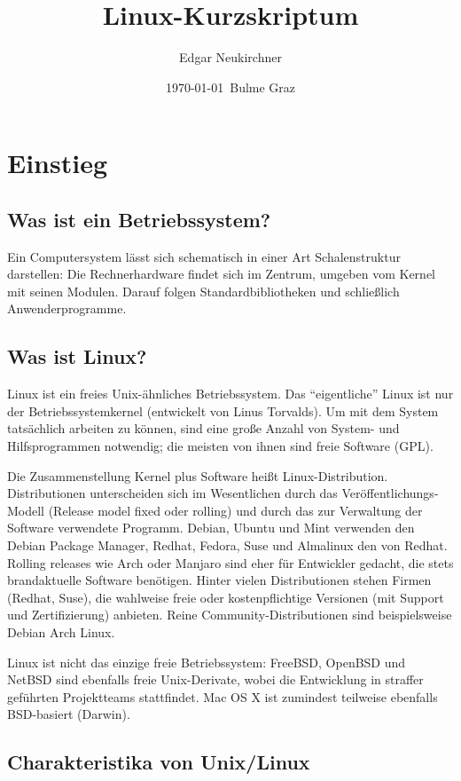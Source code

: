 \documentclass[11pt]{article}
\title{Linux-Kurzskriptum}
\author{Edgar Neukirchner}
\date{\mydate\today\ Bulme Graz}
\begin{document}
\maketitle
\newpage
\tableofcontents
\newpage

\section{Einstieg} 
\subsection{Was ist ein Betriebssystem?}
Ein Computersystem lässt sich schematisch in einer Art Schalenstruktur
darstellen: Die Rechnerhardware findet sich im Zentrum, umgeben vom
Kernel mit seinen Modulen. Darauf folgen Standardbibliotheken und
schließlich Anwenderprogramme.

\subsection{Was ist Linux?} 
Linux ist ein freies Unix-ähnliches Betriebssystem. Das ``eigentliche''
Linux ist nur der Betriebssystemkernel (entwickelt von Linus Torvalds).
Um mit dem System tatsächlich arbeiten zu können, sind eine große Anzahl
von System- und Hilfsprogrammen notwendig; die meisten von ihnen sind
freie Software (GPL).

Die Zusammenstellung Kernel plus Software heißt Linux-Distribution. Distributionen unterscheiden sich im Wesentlichen durch das Veröffentlichungs-Modell (Release model fixed oder rolling) und durch das zur Verwaltung der Software verwendete Programm. Debian, Ubuntu und Mint verwenden den Debian Package Manager, Redhat, Fedora, Suse und Almalinux den von Redhat. Rolling releases wie Arch oder Manjaro sind eher für Entwickler gedacht, die stets brandaktuelle Software benötigen.
Hinter vielen Distributionen stehen Firmen (Redhat, Suse), die wahlweise freie oder kostenpflichtige Versionen (mit Support und Zertifizierung) anbieten. Reine Community-Distributionen sind beispielsweise Debian Arch Linux.

Linux ist nicht das einzige freie Betriebssystem: FreeBSD, OpenBSD und
NetBSD sind ebenfalls freie Unix-Derivate, wobei die Entwicklung in
straffer geführten Projektteams stattfindet. Mac OS X ist zumindest
teilweise ebenfalls BSD-basiert (Darwin).

\subsection{Charakteristika von Unix/Linux}
\end{document}
